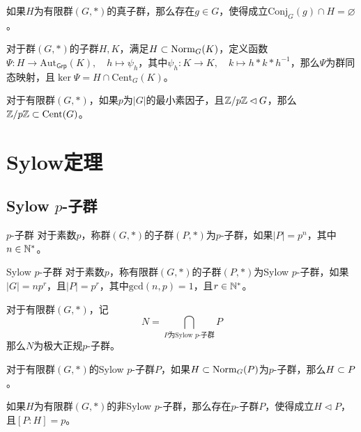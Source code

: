 \begin{proposition}
	如果$H$为有限群$(G,*)$的真子群，那么存在$g\in G$，使得成立$\mathrm{Conj}_G(g)\cap H=\varnothing$。
\end{proposition}

\begin{proposition}
	对于群$(G,*)$的子群$H,K$，满足$H\subset\mathrm{Norm}_G(K)$，定义函数$\Psi:H\to \mathrm{Aut}_{\mathsf{Grp}}(K),\quad h\mapsto \psi_h$，其中$\psi_h:K\to K,\quad k\mapsto h*k*{h}^{-1}$，那么$\Psi$为群同态映射，且$\ker\Psi=H\cap\mathrm{Cent}_G(K)$。
\end{proposition}

\begin{proposition}
	对于有限群$(G,*)$，如果$p$为$|G|$的最小素因子，且$\mathbb{Z}/p\mathbb{Z}\lhd G$，那么$\mathbb{Z}/p\mathbb{Z}\subset \mathrm{Cent}(G)$。
\end{proposition}

\section{Sylow定理}

\subsection{Sylow $p$-子群}

\begin{definition}{$p$-子群}
	对于素数$p$，称群$(G,*)$的子群$(P,*)$为$p$-子群，如果$|P|=p^n$，其中$n\in\mathbb{N}^*$。
\end{definition}

\begin{definition}{Sylow $p$-子群}
	对于素数$p$，称有限群$(G,*)$的子群$(P,*)$为Sylow $p$-子群，如果$|G|=np^r$，且$|P|=p^r$，其中$\mathrm{gcd}(n,p)=1$，且$r\in\mathbb{N}^*$。
\end{definition}

\begin{proposition}
	对于有限群$(G,*)$，记
	$$
	N=\bigcap_{P\text{为Sylow }p\text{-子群}}P
	$$
	那么$N$为极大正规$p$-子群。
\end{proposition}

\begin{proposition}
	对于有限群$(G,*)$的Sylow $p$-子群$P$，如果$H\subset\mathrm{Norm}_G(P)$为$p$-子群，那么$H\subset P$。
\end{proposition}

\begin{proposition}
	如果$H$为有限群$(G,*)$的非Sylow $p$-子群，那么存在$p$-子群$P$，使得成立$H\lhd P$，且$[P:H]=p$。
\end{proposition}

